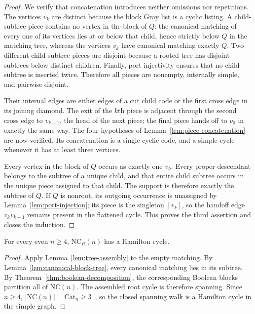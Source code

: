 \documentclass[12pt]{article}
\newcommand{\NCR}{\mathrm{NC}_R}
\newcommand{\NC}{\mathrm{NC}}
\newcommand{\catalan}{\mathrm{Cat}}
\begin{document}
\begin{proof}
We verify that concatenation introduces neither omissions nor repetitions.
The vertices $v_k$ are distinct because the block Gray list is a cyclic
listing.  A child-subtree piece contains no vertex in the block of $Q$:
the canonical matching of every one of its vertices lies at or below that
child, hence strictly below $Q$ in the matching tree, whereas the vertices
$v_k$ have canonical
matching exactly $Q$.  Two different child-subtree pieces are disjoint
because a rooted tree has disjoint subtrees below distinct children.
Finally, port injectivity ensures that no child subtree is inserted twice.
Therefore all pieces are nonempty, internally simple, and pairwise disjoint.

Their internal edges are either edges of a cut child code or the first cross
edge in its joining diamond.  The exit of the $k$th piece is adjacent through
the second cross edge to $v_{k+1}$, the head of the next piece; the final
piece hands off to $v_0$ in exactly the same way.  The four hypotheses of
Lemma~\ref{lem:piece-concatenation} are now verified.  Its concatenation is a
single cyclic code, and a simple cycle whenever it has at least three
vertices.

Every vertex in the block of $Q$ occurs as exactly one $v_k$.  Every proper
descendant belongs to the subtree of a unique child, and that entire child
subtree occurs in the unique piece assigned to that child.  The support is
therefore exactly the subtree of $Q$.  If $Q$ is nonroot, its outgoing
occurrence is unassigned by Lemma~\ref{lem:port-injection}; its piece is the
singleton $[v_k]$, so the handoff edge $v_kv_{k+1}$ remains present in the
flattened cycle.  This proves the third assertion and closes the induction.
\end{proof}

\begin{theorem}\label{thm:uniform-even}
For every even $n\geq4$, $\NCR(n)$ has a Hamilton cycle.
\end{theorem}

\begin{proof}
Apply Lemma~\ref{lem:tree-assembly} to the empty matching.  By
Lemma~\ref{lem:canonical-block-tree}, every canonical matching lies in its
subtree.  By Theorem~\ref{thm:boolean-decomposition}, the corresponding
Boolean blocks partition all of $\NC(n)$.  The assembled root cycle is
therefore spanning.  Since $n\geq4$, $|\NC(n)|=\catalan_n\geq3$~\cite{S}, so the
closed spanning walk is a Hamilton cycle in the simple graph.
\end{proof}
\end{document}
